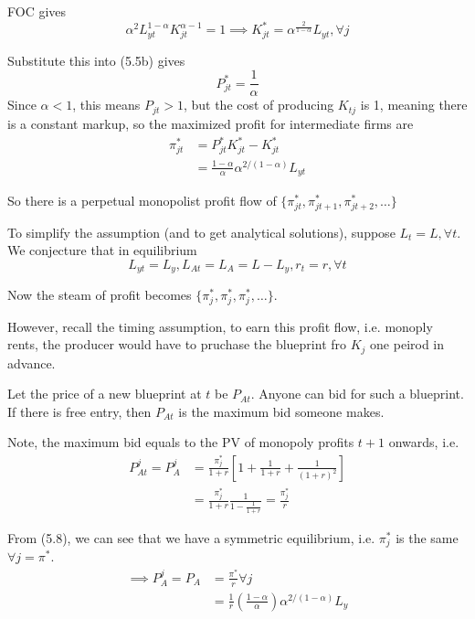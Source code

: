 \documentclass[twocolumn, fleqn]{article}
\begin{document}
		FOC gives
		\[\alpha^2 L_{yt}^{1-\alpha}K_{jt}^{\alpha-1}= 1 \implies K_{jt}^\ast = \alpha^{\frac{2}{1-\alpha}}L_{yt}, \forall j \tag{5.6}\]

		Substitute this into (5.5b) gives
		\[P_{jt}^\ast = \frac{1}{\alpha} \tag{5.7}\]
		Since $\alpha<1$, this means $P_{jt}>1$, but the cost of producing $K_{tj}$ is 1, meaning there is a
			constant markup, so the maximized profit for intermediate firms are
		\begin{align*}
			\pi_{jt}^{\ast} &= P_{jt}^{\ast}K_{jt}^{\ast}-K_{jt}^{\ast}\\
			&= \frac{1-\alpha}{\alpha}\alpha^{2/(1-\alpha)} L_{yt} \tag{5.8}
		\end{align*}

		So there is a perpetual monopolist profit flow of $\{\pi_{jt}^\ast, \pi_{jt+1}^\ast, \pi_{jt+2}^\ast, \ldots\}$

		\begin{note}
			To simplify the assumption (and to get analytical solutions), suppose $L_t=L, \forall t$.
			We conjecture that in equilibrium
			\[L_{yt}=L_y, L_{At}=L_A = L-L_y, r_t = r, \forall t \]
		\end{note}

		Now the steam of profit becomes $\{\pi_{j}^\ast, \pi_{j}^\ast, \pi_{j}^\ast, \ldots\}$.

		However, recall the timing assumption, to earn this profit flow, i.e. monoply rents, the producer would have
			to pruchase the blueprint fro $K_j$ one peirod in advance.

		Let the price of a new blueprint at $t$ be $P_{At}$.
		Anyone can bid for such a blueprint.
		If there is free entry, then $P_{At}$ is the maximum bid someone makes.

		Note, the maximum bid equals to the PV of monopoly profits $t+1$ onwards, i.e.
		\begin{align*}
			P_{At}^j = P_A^j &= \frac{\pi_j^\ast}{1+r}\left[ 1+\frac{1}{1+r}+ \frac{1}{(1+r)^2} \right]\\
			&= \frac{\pi_j^\ast}{1+r} \frac{1}{1-\frac{1}{1+r}}= \frac{\pi_j^\ast}{r}
		\end{align*}

		From (5.8), we can see that we have a symmetric equilibrium, i.e. $\pi_j^\ast$ is the same $\forall j =\pi^\ast$.
		\begin{align*}
			\implies P_A^j = P_A &= \frac{\pi^\ast}{r} \forall j\\
			&= \frac{1}{r} \left( \frac{1-\alpha}{\alpha} \right) \alpha^{2/(1-\alpha)} L_y \tag{5.9}
		\end{align*}
\end{document}
